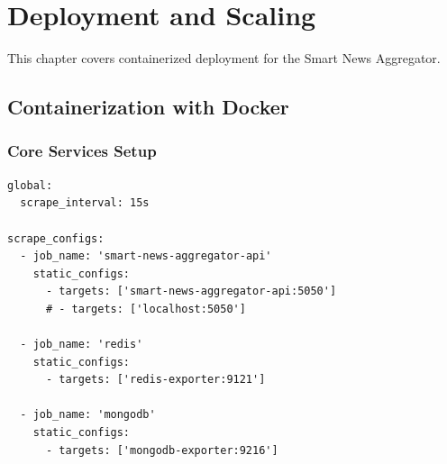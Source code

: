 

\chapter{Deployment and Scaling}\label{ch:deployment-and-scaling}

This chapter covers containerized deployment for the Smart News Aggregator.


\section{Containerization with Docker}\label{sec:containerization-with-docker}


\subsection{Core Services Setup}\label{subsec:core-services-setup}

\begin{lstlisting}[style=bashstyle,label={lst:prometheus-configuration},caption={Prometheus Configuration (prometheus.yml)}]
global:
  scrape_interval: 15s

scrape_configs:
  - job_name: 'smart-news-aggregator-api'
    static_configs:
      - targets: ['smart-news-aggregator-api:5050']
      # - targets: ['localhost:5050']

  - job_name: 'redis'
    static_configs:
      - targets: ['redis-exporter:9121']

  - job_name: 'mongodb'
    static_configs:
      - targets: ['mongodb-exporter:9216']
\end{lstlisting}



